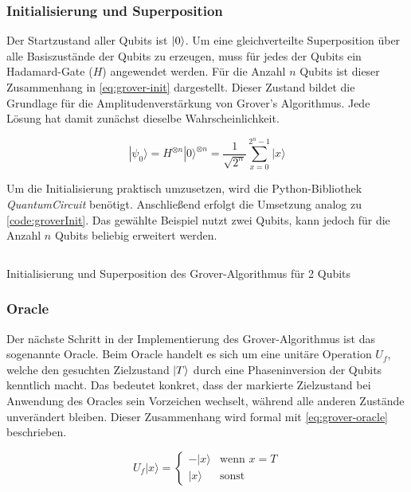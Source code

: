 \subsubsection*{Initialisierung und Superposition}
Der Startzustand aller Qubits ist $\ket{0}$. Um eine gleichverteilte Superposition über alle Basiszustände der Qubits zu erzeugen, muss für jedes der Qubits ein Hadamard-Gate ($H$) angewendet werden. Für die Anzahl $n$ Qubits ist dieser Zusammenhang in \autoref{eq:grover-init} dargestellt. Dieser Zustand bildet die Grundlage für die Amplitudenverstärkung von Grover's Algorithmus. Jede Lösung hat damit zunächst dieselbe Wahrscheinlichkeit. \autocite[257]{nielsen_quantum_2010}

\begin{equation}
\label{eq:grover-init}
|\psi_0\rangle = H^{\otimes n}|0\rangle^{\otimes n} = \frac{1}{\sqrt{2^n}} \sum_{x=0}^{2^n-1} |x\rangle
\end{equation}

Um die Initialisierung praktisch umzusetzen, wird die Python-Bibliothek \textit{QuantumCircuit} benötigt. Anschließend erfolgt die Umsetzung analog zu \autoref{code:groverInit}. Das gewählte Beispiel nutzt zwei Qubits, kann jedoch für die Anzahl $n$ Qubits beliebig erweitert werden.

\begin{listing}[ht!]
  \inputminted{python}{code/grover-init.py}
  \caption{Initialisierung und Superposition des Grover-Algorithmus für 2 Qubits}
  \label{code:groverInit}
\end{listing}

\subsubsection*{Oracle}
Der nächste Schritt in der Implementierung des Grover-Algorithmus ist das sogenannte Oracle. Beim Oracle handelt es sich um eine unitäre Operation $U_f$, welche den gesuchten Zielzustand $\ket{T}$ durch eine Phaseninversion der Qubits kenntlich macht. Das bedeutet konkret, dass der markierte Zielzustand bei Anwendung des Oracles sein Vorzeichen wechselt, während alle anderen Zustände unverändert bleiben. Dieser Zusammenhang wird formal mit \autoref{eq:grover-oracle} beschrieben.

\begin{equation}
\label{eq:grover-oracle}
U_f|x\rangle = \begin{cases}
    -|x\rangle & \text{wenn } x = T \\
    |x\rangle & \text{sonst}
\end{cases}
\end{equation}

